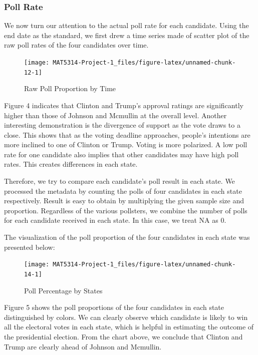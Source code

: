 \documentclass[
  12pt,
]{article}
\begin{document}
\hypertarget{poll-rate}{%
\subsubsection{Poll Rate}\label{poll-rate}}

We now turn our attention to the actual poll rate for each candidate.
Using the end date as the standard, we first drew a time series made of
scatter plot of the raw poll rates of the four candidates over time.

\begin{minipage}[t]{0.7\textwidth}
\begin{figure}
\texttt{[image: MAT5314-Project-1\_files/figure-latex/unnamed-chunk-12-1]} \caption{Raw Poll Proportion by Time}\label{fig:unnamed-chunk-12}
\end{figure}
\end{minipage}
\begin{minipage}[t]{0.3\textwidth}
\vspace{0pt}
Figure 4 indicates that Clinton and Trump’s approval ratings are significantly higher than those of Johnson and Mcmullin at the overall level. Another interesting demonstration is the divergence of support as the vote draws to a close. This shows that as the voting deadline approaches, people's intentions are more inclined to one of Clinton or Trump. Voting is more polarized. A low poll rate for one candidate also implies that other candidates may have high poll rates. This creates differences in each state.
\end{minipage}

Therefore, we try to compare each candidate's poll result in each state.
We processed the metadata by counting the polls of four candidates in
each state respectively. Result is easy to obtain by multiplying the
given sample size and proportion. Regardless of the various pollsters,
we combine the number of polls for each candidate received in each
state. In this case, we treat NA as 0.

The visualization of the poll proportion of the four candidates in each
state was presented below:

\begin{minipage}[t]{0.7\textwidth}
\begin{figure}
\texttt{[image: MAT5314-Project-1\_files/figure-latex/unnamed-chunk-14-1]} \caption{Poll Percentage by States}\label{fig:unnamed-chunk-14}
\end{figure}
\end{minipage}
\begin{minipage}[t]{0.3\textwidth}
\vspace{0pt}
Figure 5 shows the poll proportions of the four candidates in each state distinguished by colors. We can clearly observe which candidate is likely to win all the electoral votes in each state, which is helpful in estimating the outcome of the presidential election. From the chart above, we conclude that Clinton and Trump are clearly ahead of Johnson and Mcmullin. 
\end{minipage}
\end{document}
